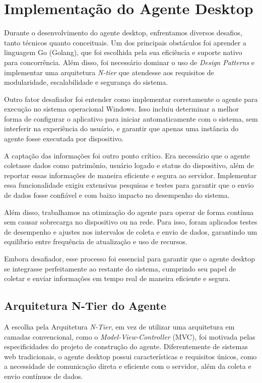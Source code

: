 \section{Implementação do Agente Desktop}

Durante o desenvolvimento do agente desktop, enfrentamos diversos desafios, tanto técnicos quanto conceituais. Um dos principais obstáculos foi aprender a linguagem Go (Golang), que foi escolhida pela sua eficiência e suporte nativo para concorrência. Além disso, foi necessário dominar o uso de \textit{Design Patterns} e implementar uma arquitetura \textit{N-tier} que atendesse aos requisitos de modularidade, escalabilidade e segurança do sistema.

Outro fator desafiador foi entender como implementar corretamente o agente para execução no sistema operacional Windows. Isso incluiu determinar a melhor forma de configurar o aplicativo para iniciar automaticamente com o sistema, sem interferir na experiência do usuário, e garantir que apenas uma instância do agente fosse executada por dispositivo.

A captação das informações foi outro ponto crítico. Era necessário que o agente coletasse dados como patrimônio, usuário logado e status do dispositivo, além de reportar essas informações de maneira eficiente e segura ao servidor. Implementar essa funcionalidade exigiu extensivas pesquisas e testes para garantir que o envio de dados fosse confiável e com baixo impacto no desempenho do sistema.

Além disso, trabalhamos na otimização do agente para operar de forma contínua sem causar sobrecarga no dispositivo ou na rede. Para isso, foram aplicados testes de desempenho e ajustes nos intervalos de coleta e envio de dados, garantindo um equilíbrio entre frequência de atualização e uso de recursos.

Embora desafiador, esse processo foi essencial para garantir que o agente desktop se integrasse perfeitamente ao restante do sistema, cumprindo seu papel de coletar e enviar informações em tempo real de maneira eficiente e segura.

\subsection{Arquitetura N-Tier do Agente}

A escolha pela Arquitetura \textit{N-Tier}, em vez de utilizar uma arquitetura em camadas convencional, como o \textit{Model-View-Controller} (MVC), foi motivada pelas especificidades do projeto de construção do agente. Diferentemente de sistemas web tradicionais, o agente desktop possui características e requisitos únicos, como a necessidade de comunicação direta e eficiente com o servidor, além da coleta e envio contínuos de dados.  

